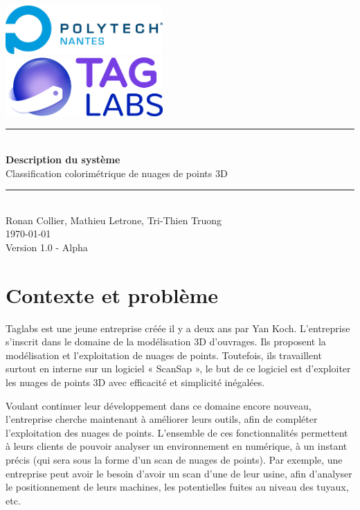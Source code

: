 \documentclass[12pt,titlepage,french]{article}
\begin{document}
\begin{titlepage}
\newcommand{\HRule}{\rule{\linewidth}{0.5mm}}
\center

  \includegraphics[width=0.45\textwidth]{../ressources/img_logos/logo_polytech.png}\\[1cm]

  \includegraphics[width=0.45\textwidth]{../ressources/img_logos/logo_taglabs.png}


\HRule \\[0.4cm]
{ \huge \bfseries Description du système \\[0.15cm] }
Classification colorimétrique de nuages de points 3D
\HRule \\[1.5cm]
Ronan Collier,
Mathieu Letrone,
Tri-Thien Truong
\\[1cm]
\today \\ [1cm]
Version 1.0 - Alpha
\end{titlepage}

\tableofcontents %
\newpage
\listoffigures  %
\newpage
\section{Contexte et problème}

Taglabs est une jeune entreprise créée il y a deux ans par Yan Koch. L’entreprise s’inscrit dans le domaine de la modélisation 3D d’ouvrages. Ils proposent la modélisation et l’exploitation de nuages de points. Toutefois, ils travaillent surtout en interne sur un logiciel « ScanSap », le but de ce logiciel est d’exploiter les nuages de points 3D avec efficacité et simplicité inégalées. \newline

Voulant continuer leur développement dans ce domaine encore nouveau, l'entreprise cherche maintenant à améliorer leurs outils, afin de compléter l'exploitation des nuages de points. L'ensemble de ces fonctionnalités permettent à leurs clients de pouvoir analyser un environnement en numérique, à un instant précis (qui sera sous la forme d'un scan de nuages de points). Par exemple, une entreprise peut avoir le besoin d'avoir un scan d'une de leur usine, afin d'analyser le positionnement de leurs machines, les potentielles fuites au niveau des tuyaux, etc. \newline
\end{document}
